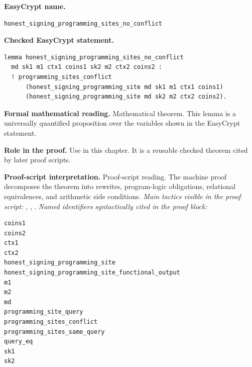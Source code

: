 \begin{formaltheorem}
\noindent\textbf{EasyCrypt name.}
\begin{lstlisting}[language=EasyCrypt,basicstyle=\ttfamily\scriptsize]
honest_signing_programming_sites_no_conflict
\end{lstlisting}
\noindent\textbf{Checked EasyCrypt statement.}
\begin{lstlisting}[language=EasyCrypt,basicstyle=\ttfamily\scriptsize]
lemma honest_signing_programming_sites_no_conflict
  md sk1 m1 ctx1 coins1 sk2 m2 ctx2 coins2 :
  ! programming_sites_conflict
      (honest_signing_programming_site md sk1 m1 ctx1 coins1)
      (honest_signing_programming_site md sk2 m2 ctx2 coins2).
\end{lstlisting}
\noindent\textbf{Formal mathematical reading.}
Mathematical theorem. This lemma is a universally quantified proposition over the variables shown in the EasyCrypt statement.

\noindent\textbf{Role in the proof.}
Use in this chapter. It is a reusable checked theorem cited by later proof scripts.

\noindent\textbf{Proof-script interpretation.}
Proof-script reading. The machine proof decomposes the theorem into rewrites, program-logic obligations, relational equivalences, and arithmetic side conditions.
\emph{Main tactics visible in the proof script:} , , .
\emph{Named identifiers syntactically cited in the proof block:}
\begin{lstlisting}[language=EasyCrypt,basicstyle=\ttfamily\scriptsize]
coins1
coins2
ctx1
ctx2
honest_signing_programming_site
honest_signing_programming_site_functional_output
m1
m2
md
programming_site_query
programming_sites_conflict
programming_sites_same_query
query_eq
sk1
sk2
\end{lstlisting}

\end{formaltheorem}

